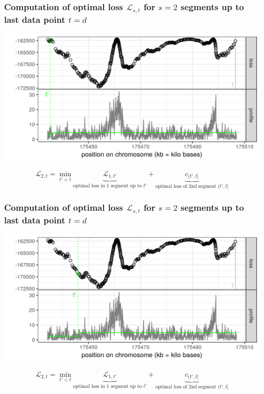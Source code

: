 
\begin{frame}
\frametitle{Computation of optimal loss $\mathcal L_{s, t}$
 for $s=2$ segments up to last data point $t = d$}
  \includegraphics[width=\textwidth]{figure-dp-1.png}

$$
\mathcal L_{2, t} =
\min_{
  t' < t
}
\underbrace{
  \mathcal L_{1, t'}
}_{
  \text{optimal loss in 1 segment up to $t'$}
}
+
\underbrace{
  c_{(t', t]}
}_{
  \text{optimal loss of 2nd segment $(t', t]$}
}
$$

\end{frame}
 
\begin{frame}
\frametitle{Computation of optimal loss $\mathcal L_{s, t}$
 for $s=2$ segments up to last data point $t = d$}
  \includegraphics[width=\textwidth]{figure-dp-2.png}

$$
\mathcal L_{2, t} =
\min_{
  t' < t
}
\underbrace{
  \mathcal L_{1, t'}
}_{
  \text{optimal loss in 1 segment up to $t'$}
}
+
\underbrace{
  c_{(t', t]}
}_{
  \text{optimal loss of 2nd segment $(t', t]$}
}
$$

\end{frame}
 
